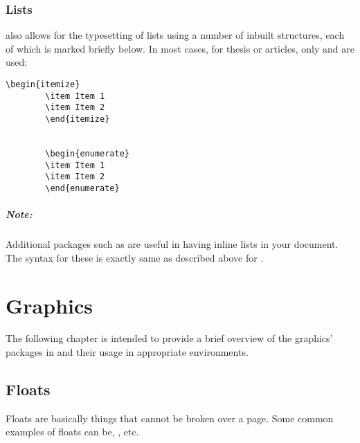 \subsection{Lists}
\latex also allows for the typesetting of lists using a number of inbuilt structures, each of which is marked briefly below. In most cases, for thesis or articles, only  and  are used: \\
\begin{lstlisting}[frame=single]
		\begin{itemize}
		\item Item 1
		\item Item 2
		\end{itemize}
		
		
		\begin{enumerate}
		\item Item 1
		\item Item 2
		\end{enumerate}
\end{lstlisting}
\paragraph{Note:} Additional packages such as  are useful in having inline lists in your document. The syntax for these is exactly same as described above for .
\chapter{Graphics}
The following chapter is intended to provide a brief overview of the graphics' packages in \latex and their usage in appropriate environments. 
\section{Floats}
Floats are basically things that cannot be broken over a page. Some common examples of floats can be, ,  etc. 
